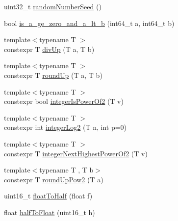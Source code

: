 \begin{DoxyCompactItemize}
\item 
uint32\+\_\+t \mbox{\hyperlink{namespaceonnxruntime_1_1math_a4aa5e50c4fa1e17ef92e533310f6d3f7}{random\+Number\+Seed}} ()
\item 
bool \mbox{\hyperlink{namespaceonnxruntime_1_1math_a22d16cbe76f993ec3e51df94fc55666a}{is\+\_\+a\+\_\+ge\+\_\+zero\+\_\+and\+\_\+a\+\_\+lt\+\_\+b}} (int64\+\_\+t a, int64\+\_\+t b)
\item 
{\footnotesize template$<$typename T $>$ }\\constexpr T \mbox{\hyperlink{namespaceonnxruntime_1_1math_a3436b4362349d9b7e0d096619024bb50}{div\+Up}} (T a, T b)
\item 
{\footnotesize template$<$typename T $>$ }\\constexpr T \mbox{\hyperlink{namespaceonnxruntime_1_1math_ad6dbf9dd4f131c20e89cbcc6a49764d0}{round\+Up}} (T a, T b)
\item 
{\footnotesize template$<$typename T $>$ }\\constexpr bool \mbox{\hyperlink{namespaceonnxruntime_1_1math_a74677e2cd75fb6ac091bd8fbf21058c7}{integer\+Is\+Power\+Of2}} (T v)
\item 
{\footnotesize template$<$typename T $>$ }\\constexpr int \mbox{\hyperlink{namespaceonnxruntime_1_1math_ac4a728f665b90f6b2e9ac0519fb3edac}{integer\+Log2}} (T n, int p=0)
\item 
{\footnotesize template$<$typename T $>$ }\\constexpr T \mbox{\hyperlink{namespaceonnxruntime_1_1math_a579936172abf18ec849ddc9b11a7ead3}{integer\+Next\+Highest\+Power\+Of2}} (T v)
\item 
{\footnotesize template$<$typename T , T b$>$ }\\constexpr T \mbox{\hyperlink{namespaceonnxruntime_1_1math_aae5e5ba084e4e7bca733da9a4c3af7e5}{round\+Up\+Pow2}} (T a)
\item 
uint16\+\_\+t \mbox{\hyperlink{namespaceonnxruntime_1_1math_af0161f533f3526e6869f3aefd52240fb}{float\+To\+Half}} (float f)
\item 
float \mbox{\hyperlink{namespaceonnxruntime_1_1math_a8de05e56120ffebec75c2cfae25d7a7c}{half\+To\+Float}} (uint16\+\_\+t h)
\item 

\end{DoxyCompactItemize}
